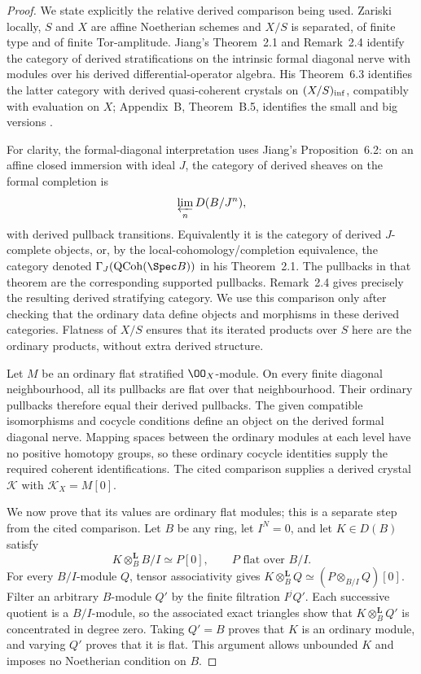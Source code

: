\begin{proof}
We state explicitly the relative derived comparison being used.  Zariski locally, $S$ and $X$ are affine Noetherian schemes and $X/S$ is separated, of finite type and of finite Tor-amplitude.  Jiang's Theorem~2.1 and Remark~2.4 identify the category of derived stratifications on the intrinsic formal diagonal nerve with modules over his derived differential-operator algebra.  His Theorem~6.3 identifies the latter category with derived quasi-coherent crystals on $(X/S)_{\rm inf}$, compatibly with evaluation on $X$; Appendix~B, Theorem~B.5, identifies the small and big versions \citep[pp.~16--17, 32--34 and 43--45]{Jiang2023Derived}.

For clarity, the formal-diagonal interpretation uses Jiang's Proposition~6.2: on an affine closed immersion with ideal $J$, the category of derived sheaves on the formal completion is
\[
       \varprojlim_n D(B/J^n),
\]
with derived pullback transitions.  Equivalently it is the category of derived $J$-complete objects, or, by the local-cohomology/completion equivalence, the category denoted $\Gamma_J(\mathrm{QCoh}(\Spec B))$ in his Theorem~2.1.  The pullbacks in that theorem are the corresponding supported pullbacks.  Remark~2.4 gives precisely the resulting derived stratifying category.  We use this comparison only after checking that the ordinary data define objects and morphisms in these derived categories.  Flatness of $X/S$ ensures that its iterated products over $S$ here are the ordinary products, without extra derived structure.

Let $M$ be an ordinary flat stratified $\OO_X$-module.  On every finite diagonal neighbourhood, all its pullbacks are flat over that neighbourhood.  Their ordinary pullbacks therefore equal their derived pullbacks.  The given compatible isomorphisms and cocycle conditions define an object on the derived formal diagonal nerve.  Mapping spaces between the ordinary modules at each level have no positive homotopy groups, so these ordinary cocycle identities supply the required coherent identifications.  The cited comparison supplies a derived crystal $\mathcal K$ with $\mathcal K_X=M[0]$.

We now prove that its values are ordinary flat modules; this is a separate step from the cited comparison.  Let $B$ be any ring, let $I^N=0$, and let $K\in D(B)$ satisfy
\[
          K\otimes_B^{\mathbf L}B/I\simeq P[0],
          \qquad P\text{ flat over }B/I.
\]
For every $B/I$-module $Q$, tensor associativity gives
$K\otimes_B^{\mathbf L}Q\simeq(P\otimes_{B/I}Q)[0]$.
Filter an arbitrary $B$-module $Q'$ by the finite filtration $I^jQ'$.  Each successive quotient is a $B/I$-module, so the associated exact triangles show that $K\otimes_B^{\mathbf L}Q'$ is concentrated in degree zero.  Taking $Q'=B$ proves that $K$ is an ordinary module, and varying $Q'$ proves that it is flat.  This argument allows unbounded $K$ and imposes no Noetherian condition on $B$.


\end{proof}
